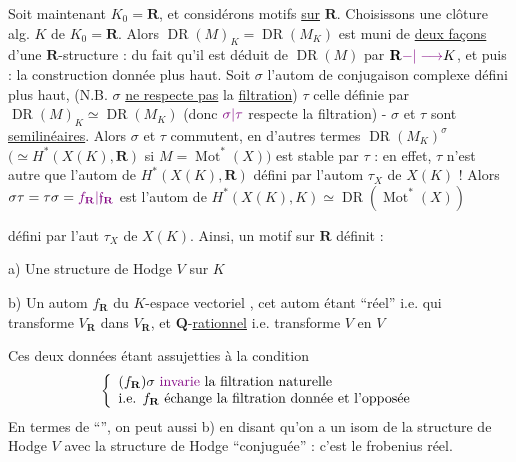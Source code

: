  Soit maintenant $K_0=\mathbf R$, et considérons motifs  \uline{sur} $\mathbf R$. Choisissons une clôture alg. $K$ de $K_0=\mathbf R$. Alors $\operatorname{DR}(M)_K=\operatorname{DR}(M_K)$ est muni de \uline{deux façons} d'une $\mathbf R$-structure : du fait qu'il est déduit de $\operatorname{DR}(M)$ par $\mathbf R\unsure{-|\longrightarrow}K$, et puis : la construction donnée plus haut. Soit $\sigma$ l'autom de conjugaison complexe défini plus haut, (N.B. $\sigma$ \uline{ne respecte pas} la \uline{filtration}) $\tau$ celle définie par $\operatorname{DR}(M)_K\simeq\operatorname{DR}(M_K)$ (donc $\unsure{\sigma|\tau}$ respecte la filtration) - $\sigma$ et $\tau$ sont \uline{semilinéaires}. Alors $\sigma$ et $\tau$ commutent, en d'autres termes $\operatorname{DR}(M_K)^\sigma$ $(\simeq H^*(X(K),\mathbf R)$ si $M=\operatorname{Mot}^*(X))$ est stable par $\tau$ : en effet, $\tau$ n'est autre que l'autom de $H^*(X(K),\mathbf R)$ défini par l'autom $\tau_X$ de $X(K)$ ! Alors $\sigma\tau=\tau\sigma=\unsure{f_{\mathbf R}|\mathfrak f_{\mathbf R}}$ est l'autom de $H^*(X(K),K)\simeq\operatorname{DR}(\operatorname{Mot}^*(X))$


défini par l'aut  $\tau_X$ de $X(K)$. Ainsi, un motif sur $\mathbf R$ définit :

a) Une structure de Hodge $V$ sur $K$

b) Un autom $f_{\mathbf R}$  du $K$-espace vectoriel  , cet autom étant ``réel'' i.e. qui transforme $V_{\mathbf R}$ dans $V_{\mathbf R}$, et $\mathbf Q$-\uline{rationnel} i.e. transforme $V$ en $V$


Ces deux données étant assujetties à la condition
\[
\left\{\begin{array}{l}
(f_{\mathbf R})\sigma\ \text{\unsure{invarie} la filtration naturelle}\\
\text{i.e. }f_{\mathbf R}\ \text{échange la filtration donnée et l'opposée}
\end{array}\right.
\]
En termes de ``'', on peut   aussi b) en disant qu'on a un isom de la structure de Hodge $V$ avec la structure de Hodge  ``conjuguée'' : c'est le frobenius réel.

